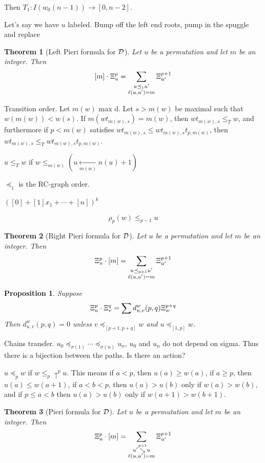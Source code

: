 \documentclass{elsarticle}
\newtheorem{proposition}[lemma]{Proposition}
\newtheorem{theorem}{Theorem}[section]
\theoremstyle{definition}
\theoremstyle{remark}
\numberwithin{equation}{subsection}
\newcommand{\downvar}[1]{\stackrel{#1}{\searrow}}
\begin{document}
Then $T_1:I(w_0(n-1))\to [0,n-2]$.

Let's say we have $u$ labeled. Bump off the left end roots, pump in the spuggle and replace

\begin{theorem}[Left Pieri formula for $\mathcal{D}$]
	Let $u$ be a permutation and let $m$ be an integer. Then
	$$[m]\cdot\Xi_u^{p} = \sum_{\substack{u\preceq_1 u'\\\ell(u,u')=m}} \Xi_{u'}^{p+1}$$
	
\end{theorem}

Transition order. Let $m(w)$ max d. Let $s>m(w)$ be maximal such that $w(m(w))<w(s)$. If $m(wt_{m(w),s})=m(w)$, then $wt_{m(w),s}\leq_T w$, and furthermore if $p<m(w)$ satisfies $wt_{m(w),s}\leq wt_{m(w),s}t_{p,m(w)}$, then $wt_{m(w),s}\leq_T wt_{m(w),s}t_{p,m(w)}$.

$u\leq_T w$ if $w\leq_{m(w)} (u\xleftarrow[m(w)]{} n(u)+1)$

$\preceq_1$ is the RC-graph order. 


$([0]+[1]x_1+\cdots+[n])^k$



$$\rho_p(w)\leq_{p-1} u$$

\begin{theorem}[Right Pieri formula for $\mathcal{D}$]
	Let $u$ be a permutation and let $m$ be an integer. Then
	$$\Xi_u^p\cdot [m] = \sum_{\substack{u\preceq_{p+1} u'\\\ell(u,u')=m}} \Xi_{u'}^{p+1}$$
\end{theorem}

\begin{proposition}
	Suppose
	$$\Xi_u^p\cdot\Xi_v^q = \sum d_{u,v}^w(p,q)\Xi_w^{p+q}$$
	Then $d_{u,v}^w(p,q)=0$ unless $v\preceq_{[p+1,p+q]} w$ and $u\preceq_{[1,p]} w$.
\end{proposition}

Chains transfer. $u_0\preceq_{\sigma(1)}\cdots\preceq_{\sigma(n)} u_n$, $u_0$ and $u_n$ do not depend on sigma. Thus there is a bijection between the paths. Is there an action?

$u\preceq_p w$ if $w\leq_p \uparrow^p u$. This means if $a<p$, then $u(a)\geq  w(a)$, if $a\geq p$, then $u(a)\leq w(a+1)$, if $a<b<p$, then $u(a)>u(b)$ only if $w(a)>w(b)$, and if $p\leq a<b$ then $u(a)>u(b)$ only if $w(a+1)>w(b+1)$.

\begin{theorem}[Pieri formula for $\mathcal{D}$]
	Let $u$ be a permutation and let $m$ be an integer. Then
	$$\dsch_u^{p}\cdot [m] = \sum_{\substack{u'\downvar{p+1} u\\\ell(u,u')=m}} \dsch_{u'}^{p+1}$$
	
\end{theorem}
\end{document}

